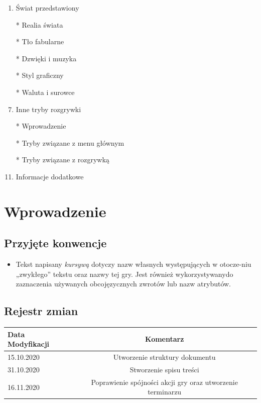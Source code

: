 \documentclass{article}
\begin{document}
\begin{enumerate}
	\item Świat przedstawiony   
	    \item[*] Realia świata  
	    \item[*] Tło fabularne 
	    \item[*] Dzwięki i muzyka
        \item[*] Styl graficzny
	    \item[*] Waluta i surowce
	    
	    
	    
    \item  Inne tryby rozgrywki 
        \item[*] Wprowadzenie
	    \item[*] Tryby związane z menu głównym 
	    \item[*] Tryby związane z rozgrywką 

	\item  Informacje dodatkowe
	   
	\end{enumerate}
	
	
	
	
	
	\newpage
	
	
	
	
\section{Wprowadzenie}
    \subsection{Przyjęte konwencje}
\begin{itemize}
    \item Tekst napisany \emph{kursywą} dotyczy nazw własnych występujących w otocze-niu „zwykłego” tekstu oraz nazwy tej gry. Jest również wykorzystywanydo zaznaczenia używanych obcojęzycznych zwrotów lub nazw atrybutów.
\end{itemize}
    \subsection{Rejestr zmian}
\begin{tabular}{|l|c|}
	\hline
	Data Modyfikacji & Komentarz\\
	\hline
	15.10.2020  & Utworzenie struktury dokumentu\\
	\hline
	31.10.2020  & Stworzenie spisu treści \\
	\hline
    16.11.2020  & Poprawienie spójności akcji gry oraz utworzenie terminarzu\\
	\hline
\end{tabular}
\end{document}
